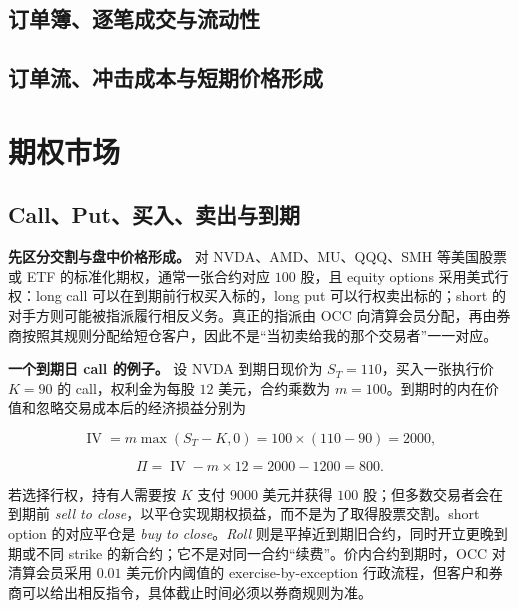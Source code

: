 \subsection{订单簿、逐笔成交与流动性}

\subsection{订单流、冲击成本与短期价格形成}


\section{期权市场}

\subsection{Call、Put、买入、卖出与到期}

\textbf{先区分交割与盘中价格形成。} 对 NVDA、AMD、MU、QQQ、SMH 等美国股票或 ETF 的标准化期权，通常一张合约对应 \(100\) 股，且 equity options 采用美式行权：long call 可以在到期前行权买入标的，long put 可以行权卖出标的；short 的对手方则可能被指派履行相反义务。真正的指派由 OCC 向清算会员分配，再由券商按照其规则分配给短仓客户，因此不是“当初卖给我的那个交易者”一一对应。

\textbf{一个到期日 call 的例子。} 设 NVDA 到期日现价为 \(S_T=110\)，买入一张执行价 \(K=90\) 的 call，权利金为每股 \(12\) 美元，合约乘数为 \(m=100\)。到期时的内在价值和忽略交易成本后的经济损益分别为

\[
\operatorname{IV}=m\max(S_T-K,0)=100\times(110-90)=2000,
\]

\[
\Pi=\operatorname{IV}-m\times12=2000-1200=800.
\]

若选择行权，持有人需要按 \(K\) 支付 \(9000\) 美元并获得 \(100\) 股；但多数交易者会在到期前 \textit{sell to close}，以平仓实现期权损益，而不是为了取得股票交割。short option 的对应平仓是 \textit{buy to close}。\textit{Roll} 则是平掉近到期旧合约，同时开立更晚到期或不同 strike 的新合约；它不是对同一合约“续费”。价内合约到期时，OCC 对清算会员采用 \(0.01\) 美元价内阈值的 exercise-by-exception 行政流程，但客户和券商可以给出相反指令，具体截止时间必须以券商规则为准。

